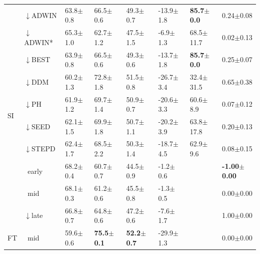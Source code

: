 \begin{tabular}{llllllll}
\midrule
\multirow[t]{10}{*}{SI} & $\downarrow$ADWIN & 63.8\tiny{$\pm$0.8} & 66.5\tiny{$\pm$0.6} & 49.3\tiny{$\pm$0.7} & -13.9\tiny{$\pm$1.8} & \textbf{85.7\tiny{$\pm$0.0}} & 0.24\tiny{$\pm$0.08} \\
 & $\downarrow$ADWIN* & 65.3\tiny{$\pm$1.0} & 62.7\tiny{$\pm$1.2} & 47.5\tiny{$\pm$1.5} & -6.9\tiny{$\pm$1.3} & 68.5\tiny{$\pm$11.7} & 0.02\tiny{$\pm$0.13} \\
 & $\downarrow$BEST & 63.9\tiny{$\pm$0.8} & 66.5\tiny{$\pm$0.6} & 49.3\tiny{$\pm$0.6} & -13.7\tiny{$\pm$1.8} & \textbf{85.7\tiny{$\pm$0.0}} & 0.25\tiny{$\pm$0.07} \\
 & $\downarrow$DDM & 60.2\tiny{$\pm$1.3} & 72.8\tiny{$\pm$1.8} & 51.5\tiny{$\pm$0.8} & -26.7\tiny{$\pm$3.4} & 32.4\tiny{$\pm$31.5} & 0.65\tiny{$\pm$0.38} \\
 & $\downarrow$PH & 61.9\tiny{$\pm$1.2} & 69.7\tiny{$\pm$1.4} & 50.9\tiny{$\pm$0.7} & -20.6\tiny{$\pm$3.3} & 60.6\tiny{$\pm$8.9} & 0.07\tiny{$\pm$0.12} \\
 & $\downarrow$SEED & 62.1\tiny{$\pm$1.5} & 69.9\tiny{$\pm$1.8} & 50.7\tiny{$\pm$1.1} & -20.2\tiny{$\pm$3.9} & 63.8\tiny{$\pm$17.8} & 0.20\tiny{$\pm$0.13} \\
 & $\downarrow$STEPD & 62.4\tiny{$\pm$1.7} & 68.5\tiny{$\pm$2.2} & 50.3\tiny{$\pm$1.4} & -18.7\tiny{$\pm$4.5} & 62.9\tiny{$\pm$9.6} & 0.08\tiny{$\pm$0.15} \\
 & $\ \;$early & 68.2\tiny{$\pm$0.4} & 60.7\tiny{$\pm$0.7} & 44.5\tiny{$\pm$0.9} & -1.2\tiny{$\pm$0.6} &  & \textbf{-1.00\tiny{$\pm$0.00}} \\
 & $\ \;$mid & 68.1\tiny{$\pm$0.3} & 61.2\tiny{$\pm$0.6} & 45.5\tiny{$\pm$0.8} & -1.3\tiny{$\pm$0.5} &  & 0.00\tiny{$\pm$0.00} \\
 & $\downarrow$late & 66.8\tiny{$\pm$0.7} & 64.8\tiny{$\pm$0.6} & 47.2\tiny{$\pm$0.6} & -7.6\tiny{$\pm$1.7} &  & 1.00\tiny{$\pm$0.00} \\
\midrule
FT & $\ \;$mid & 59.6\tiny{$\pm$0.6} & \textbf{75.5\tiny{$\pm$0.1}} & \textbf{52.2\tiny{$\pm$0.7}} & -29.9\tiny{$\pm$1.3} &  & 0.00\tiny{$\pm$0.00} \\
\bottomrule
\end{tabular}

